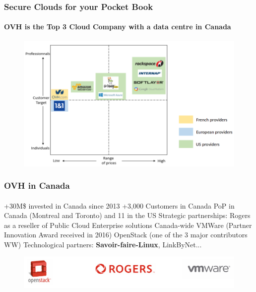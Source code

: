 \documentclass{beamer}
\begin{document}
	\begin{frame}
	\frametitle{Secure Clouds for your Pocket Book}
	\framesubtitle{OVH is the Top 3 Cloud Company with a data centre in Canada}
	        \begin{figure}[h]
                \centering
                \includegraphics[width=.8\textwidth]{./images/OVH-cloud-magic-quadrant}
        	\end{figure}
	\end{frame}

	\begin{frame}
	\frametitle{OVH in Canada}
	\framesubtitle{}
		\begin{outline}
			\1 +30M\$ invested in Canada since 2013 
			\1 +3,000 Customers in Canada
			 PoP in Canada (Montreal and Toronto) and 11 in the US
			\1 Strategic partnerships:
				\2 Rogers as a reseller of Public Cloud Enterprise solutions Canada-wide 
				\2 VMWare (Partner Innovation Award received in 2016)
				\2 OpenStack (one of the 3 major contributors WW)
			\1 Technological partners: \textbf{Savoir-faire-Linux}, LinkByNet...%
		\end{outline}
	        \begin{figure}[h]
                \centering
                \includegraphics[width=.8\textwidth]{./images/OpenStack-Rogers-VMWare}
        	\end{figure}
	\end{frame}
\end{document}
